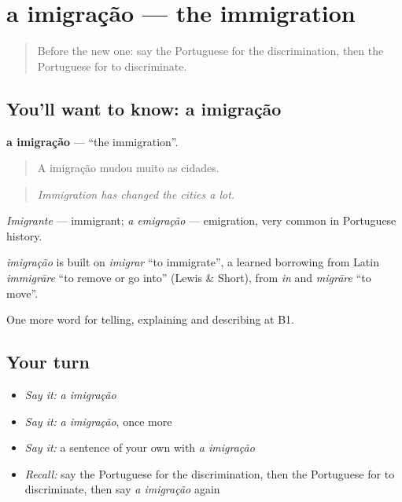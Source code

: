 \section[a imigração]{a imigração — the immigration}

\label{lesson:PT-C366-imigracao}



\begin{quote}
Before the new one: say the Portuguese for the discrimination, then the Portuguese for to discriminate.
\end{quote}

\subsection*{You'll want to know: a imigração}
\textbf{a imigração} — \textquotedblleft{}the immigration\textquotedblright{}.

\begin{quote}
A imigração mudou muito as cidades.
\end{quote}

\begin{quote}
\emph{Immigration has changed the cities a lot.}
\end{quote}

\emph{Imigrante} — immigrant; \emph{a emigração} — emigration, very common in Portuguese history.

\begin{cousinweb}
\emph{imigração} is built on \emph{imigrar} \textquotedblleft{}to immigrate\textquotedblright{}, a learned borrowing from Latin \emph{immigrāre} \textquotedblleft{}to remove or go into\textquotedblright{} (Lewis \& Short), from \emph{in} and \emph{migrāre} \textquotedblleft{}to move\textquotedblright{}.
\end{cousinweb}

\begin{grammarlens}[title={What you've built}]
One more word for telling, explaining and describing at B1.
\end{grammarlens}

\subsection*{Your turn}
\begin{itemize}
\raggedright
  \item \emph{Say it:} \emph{a imigração}
  \item \emph{Say it:} \emph{a imigração}, once more
  \item \emph{Say it:} a sentence of your own with \emph{a imigração}
  \item \emph{Recall:} say the Portuguese for the discrimination, then the Portuguese for to discriminate, then say \emph{a imigração} again
\end{itemize}

